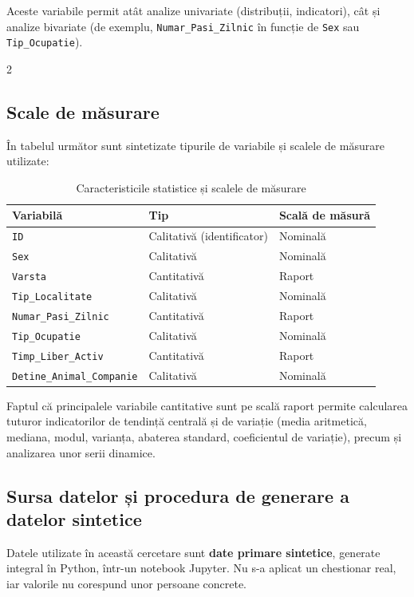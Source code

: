 \documentclass[12pt,a4paper]{report}
\begin{document}
Aceste variabile permit atât analize univariate (distribuții, indicatori), cât și analize bivariate (de exemplu, \texttt{Numar\_Pasi\_Zilnic} în funcție de \texttt{Sex} sau \texttt{Tip\_Ocupatie}).

2\subsection{Scale de măsurare}

În tabelul următor sunt sintetizate tipurile de variabile și scalele de măsurare utilizate:

\begin{table}[H]
\centering
\caption{Caracteristicile statistice și scalele de măsurare}
\label{tab:caracteristici_scale}
\begin{tabular}{lll}
\toprule
Variabilă & Tip & Scală de măsură \\
\midrule
\texttt{ID} & Calitativă (identificator) & Nominală \\
\texttt{Sex} & Calitativă & Nominală \\
\texttt{Varsta} & Cantitativă & Raport \\
\texttt{Tip\_Localitate} & Calitativă & Nominală \\
\texttt{Numar\_Pasi\_Zilnic} & Cantitativă & Raport \\
\texttt{Tip\_Ocupatie} & Calitativă & Nominală \\
\texttt{Timp\_Liber\_Activ} & Cantitativă & Raport \\
\texttt{Detine\_Animal\_Companie} & Calitativă & Nominală \\
\bottomrule
\end{tabular}
\end{table}

Faptul că principalele variabile cantitative sunt pe scală raport permite calcularea tuturor indicatorilor de tendință centrală și de variație (media aritmetică, mediana, modul, varianța, abaterea standard, coeficientul de variație), precum și analizarea unor serii dinamice.

\subsection{Sursa datelor și procedura de generare a datelor sintetice}

Datele utilizate în această cercetare sunt \textbf{date primare sintetice}, generate integral în Python, într-un notebook Jupyter. Nu s-a aplicat un chestionar real, iar valorile nu corespund unor persoane concrete.
\end{document}
